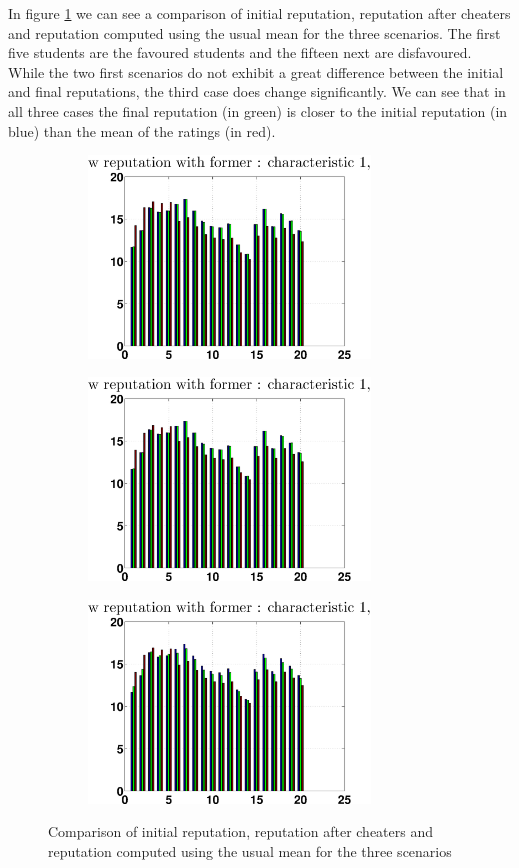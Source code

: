 \documentclass[12pt,a4paper]{article}
\begin{document}
In figure \ref{finalCheat} we can see a comparison of initial reputation, reputation after cheaters and reputation computed using the usual mean for the three scenarios. The first five students are the favoured students and the fifteen next are disfavoured. While the two first scenarios do not exhibit a great difference between the initial and final reputations, the third case does change significantly. We can see that in all three cases the final reputation (in green) is closer to the initial reputation (in blue) than the mean of the ratings (in red).
\begin{figure}
\centering
\begin{subfigure}[b]{0.49\textwidth}
\includegraphics[width = 7.5cm]{cheaters/chcompareRepStupidc1.eps}
\end{subfigure}
\begin{subfigure}[b]{0.49\textwidth}
\includegraphics[width = 7.5cm]{cheaters/chcompareRepSmartc1.eps}
\end{subfigure}
\begin{subfigure}[b]{0.49\textwidth}
\includegraphics[width = 7.5cm]{cheaters/chcompareRepMixc1.eps}
\end{subfigure}
\caption{\label{finalCheat}Comparison of initial reputation, reputation after cheaters and reputation computed using the usual mean for the three scenarios}
\end{figure}





\nocite{*}
\end{document}
